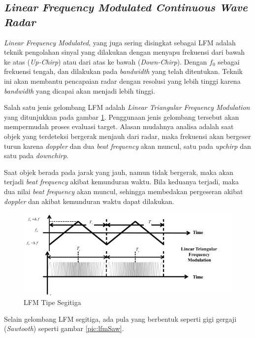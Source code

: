 \subsection{\textit{Linear Frequency Modulated Continuous Wave Radar}}
\textit{Linear Frequency Modulated}, yang juga sering disingkat sebagai LFM adalah teknik pengolahan sinyal yang dilakukan dengan menyapu frekuensi dari bawah ke atas (\textit{Up-Chirp}) atau dari atas ke bawah (\textit{Down-Chirp}). Dengan $f_{0}$ sebagai frekuensi tengah, dan dilakukan pada \textit{bandwidth} yang telah ditentukan. Teknik ini akan membantu pencapaian radar dengan resolusi yang lebih tinggi karena \textit{bandwidth} yang dicapai akan menjadi lebih tinggi.

Salah satu jenis gelombang LFM adalah \textit{Linear Triangular Frequency Modulation} yang ditunjukkan pada gambar \ref{pic:LFMTriangular}. Penggunaan jenis gelombang tersebut akan mempermudah proses evaluasi target. Alasan mudahnya analisa adalah saat objek yang terdeteksi bergerak menjauh dari radar, maka frekuensi akan bergeser turun karena \textit{doppler} dan dua \textit{beat frequency} akan muncul, satu pada \textit{upchirp} dan satu pada \textit{downchirp}. 

Saat objek berada pada jarak yang jauh, namun tidak bergerak, maka akan terjadi \textit{beat frequency} akibat kemunduran waktu. Bila keduanya terjadi, maka dua nilai \textit{beat frequency} akan muncul, sehingga membedakan pergeseran akibat \textit{doppler} dan akibat kemunduran waktu dapat dilakukan.

\begin{figure}
	\begin{center}
		\includegraphics[scale=0.55]{pics/bab2/lfmTriangular.png}
		\caption[LFM Tipe Segitiga]{LFM Tipe Segitiga \cite{Jankiraman2018}}
		\label{pic:LFMTriangular}
	\end{center}
\end{figure}


Selain gelombang LFM segitiga, ada pula yang berbentuk seperti gigi gergaji (\textit{Sawtooth}) seperti gambar \ref{pic:lfmSaw}.

